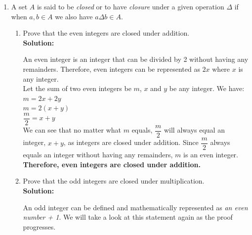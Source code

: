 \documentclass[12pt]{book}
\begin{document}
\begin{enumerate}

\item A set $A$ is said to be \emph{closed} or to have \emph{closure} under a given operation $\Delta$ if when $a,b \in A$ we also have $a \Delta b \in A$. 

\begin{enumerate}
\item Prove that the even integers are closed under addition.\\

\textbf{Solution:}

An even integer is an integer that can be divided by 2 without having any remainders. Therefore, even integers can be represented as $2x$ where $x$ is any integer.\\

Let the sum of two even integers be $m$, $x$ and $y$ be any integer. We have:\\
$m = 2x + 2y$\\
$m = 2(x+y)$\\
$\dfrac{m}{2} = x + y$\\

We can see that no matter what $m$ equals, $\dfrac{m}{2}$ will always equal an integer, $x + y$, as integers are closed under addition. Since $\dfrac{m}{2}$ always equals an integer without having any remainders, $m$ is an even integer.\\

\textbf{Therefore, even integers are closed under addition.\\}
\item Prove that the odd integers are closed under multiplication.\\

\textbf{Solution:}

An odd integer can be defined and mathematically represented as \textit{an even number + 1}. We will take a look at this statement again as the proof progresses.\\


\end{enumerate}
\end{enumerate}
\end{document}
